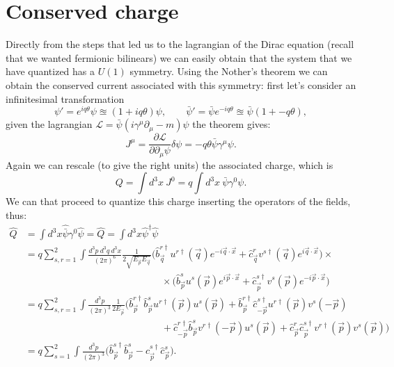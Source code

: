 \section{Conserved charge}
Directly from the steps that led us to the lagrangian of the Dirac equation (recall that we wanted fermionic bilinears) we can easily obtain that the system that we have quantized has a $U(1)$ symmetry. Using the Nother's theorem we can obtain the conserved current associated with this symmetry: first let's consider an infinitesimal transformation
\begin{equation*}
    \psi'=e^{iq\theta}\psi\approxeq(1+iq\theta)\psi,\qquad\bar\psi'=\bar\psi e^{-iq\theta}\approxeq\bar\psi(1+-q\theta),
\end{equation*}
given the lagrangian $\mathcal{L} =\bar\psi(i\gamma^\mu\partial_\mu-m)\psi$ the theorem gives:
\begin{equation*}
    J^\mu=\frac{\partial\mathcal{L} }{\partial\partial_\mu\psi}\delta\psi=-q\theta\bar\psi\gamma^\mu\psi.
\end{equation*}
Again we can rescale (to give the right units) the associated charge, which is
\begin{equation*}
    Q=\int d^3x\ J^0=q\int d^3x\ \bar\psi\gamma^0\psi.
\end{equation*}
We can that proceed to quantize this charge inserting the operators of the fields, thus:
\begin{align*}
    \hat{Q}&=\int d^3x\hat{\bar\psi}\gamma^0\hat{\psi}=
    \hat{Q}=\int d^3x\hat{\psi}^\dagger\hat{\psi}\\&=q\sum_{s,r=1}^{2}\int\frac{d^3p\ d^3q\ d^3x}{(2\pi)^6}\frac{1}{2\sqrt{E_{\vec p}E_{\vec q}}}\big(\hat{b}^{r\dagger}_{\vec q}u^{r\dagger}(\vec q)e^{-i\vec q\cdot\vec x}+\hat{c}^{r}_{\vec q}v^{s\dagger}(\vec q)e^{i\vec q\cdot\vec x}\big)\times\\&\qquad\qquad\qquad\qquad\qquad\qquad\qquad\times\big(\hat{b}^{s}_{\vec p}u^s(\vec p)e^{i\vec p\cdot\vec x}+\hat{c}^{s\dagger}_{\vec p}v^s(\vec p)e^{-i\vec p\cdot\vec x}\big)\\&=q\sum_{s,r=1}^{2}\int\frac{d^3p}{(2\pi)^3}\frac{1}{2E_{\vec p}}\big(\hat{b}^{r\dagger}_{\vec p}\hat{b}^{s}_{\vec p}u^{r\dagger}(\vec p)u^s(\vec p)+\hat{b}^{r\dagger}_{\vec p}\hat{c}^{s\dagger}_{-\vec p}u^{r\dagger}(\vec p)v^s(-\vec p)\\&\qquad\qquad\qquad\qquad\qquad\qquad\qquad+\hat{c}^{r\dagger}_{-\vec p}\hat{b}^{s}_{\vec p}v^{r\dagger}(-\vec p)u^s(\vec p)+\hat{c}^{r}_{\vec p}\hat{c}^{s\dagger}_{\vec p}v^{r\dagger}(\vec p)v^s(\vec p)\big)\\&=q\sum_{s=1}^{2}\int\frac{d^3p}{(2\pi)^3}\big(\hat{b}_{\vec p}^{s\dagger}\hat{b}_{\vec p}^{s}-\hat{c}_{\vec p}^{s\dagger}\hat{c}_{\vec p}^{s}\big).
\end{align*}
